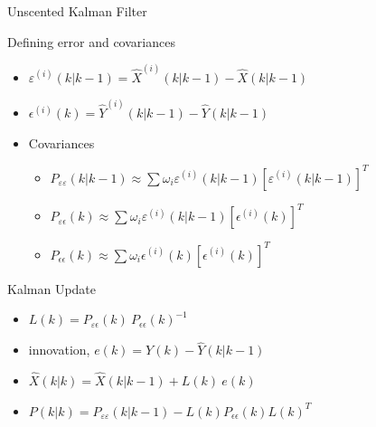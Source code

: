 \documentclass{beamer}
\begin{document}
\begin{frame}{Unscented Kalman Filter}
\begin{block}{Defining error and covariances}
\begin{itemize}
    \item $\varepsilon^{(i)}(k|k-1) = \widehat{X}^{(i)}(k|k-1) - \widehat{X}(k|k-1)$
    \item $\epsilon^{(i)}(k)= \widehat{Y}^{(i)}(k|k-1) - \widehat{Y}(k|k-1)$
    \item Covariances
        \begin{itemize}
            \item $P_{\varepsilon\varepsilon}(k|k-1)\approx \sum\omega_i\varepsilon^{(i)}(k|k-1)[\varepsilon^{(i)}(k|k-1)]^T$
            \item $P_{\varepsilon\epsilon}(k)\approx \sum\omega_i\varepsilon^{(i)}(k|k-1)[\epsilon^{(i)}(k)]^T$
            \item $P_{\epsilon\epsilon}(k)\approx \sum\omega_i\epsilon^{(i)}(k)[\epsilon^{(i)}(k)]^T$
        \end{itemize}
\end{itemize}
\end{block}
\begin{block}{Kalman Update}
\begin{itemize}
    \item $L(k)=P_{\varepsilon\epsilon}(k)\ P_{\epsilon\epsilon}(k)^{-1}$
    \item innovation, $e(k) =Y(k) - \widehat{Y}(k|k-1)$
    \item $\widehat{X}(k|k)=\widehat{X}(k|k-1)+ L(k) \ e(k)$
    \item $P(k|k)= P_{\varepsilon\varepsilon}(k|k-1) - L(k)P_{\epsilon\epsilon}(k)L(k)^T$
\end{itemize}
\end{block}
\end{frame}
\end{document}
